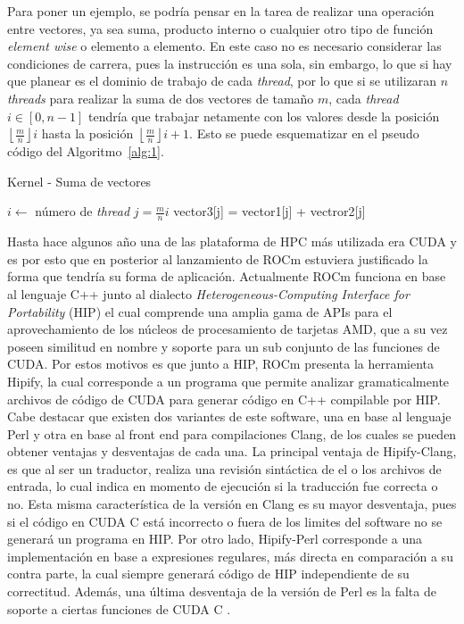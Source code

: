 Para poner un ejemplo, se podría pensar en la tarea de realizar una operación entre vectores, ya sea suma, producto interno o cualquier otro tipo de función \textit{element wise} o elemento a elemento.
En este caso no es necesario considerar las condiciones de carrera, pues la instrucción es una sola, sin embargo, lo que si hay que planear es el dominio de trabajo de cada \textit{thread}, por lo que si se utilizaran \(n\) \textit{threads} para realizar la suma de dos vectores de tamaño \(m\), cada \textit{thread} $i \in [ 0, n-1]$ tendría que trabajar netamente con los valores desde la posición $\left \lfloor{\frac{m}{n}}\right \rfloor  i$ hasta la posición $\left \lfloor{\frac{m}{n}}\right \rfloor i+1$.
Esto se puede esquematizar en el pseudo código del Algoritmo~\ref{alg:1}.
\begin{algorithm}
\caption{Kernel - Suma de vectores}
\label{alg:1}
\begin{algorithmic}[1]
\State $i \leftarrow$ número de \textit{thread}
\State $j = \frac{m}{n} i$  
    \State vector3[j] = vector1[j] + vectror2[j]
\EndFor
\EndProcedure
\end{algorithmic}
\end{algorithm}

Hasta hace algunos año una de las plataforma de HPC más utilizada era CUDA y es por esto que en posterior al lanzamiento de ROCm estuviera justificado la forma que tendría su forma de aplicación. 
Actualmente ROCm funciona en base al lenguaje C++ junto al dialecto \textit{Heterogeneous-Computing Interface for Portability} (HIP) el cual comprende una amplia gama de APIs para el aprovechamiento de los núcleos de procesamiento de tarjetas AMD, que a su vez poseen similitud en nombre y soporte para un sub conjunto de las funciones de CUDA.
Por estos motivos es que junto a HIP, ROCm presenta la herramienta Hipify, la cual corresponde a un programa que permite analizar gramaticalmente archivos de código de CUDA para generar código en C++ compilable por HIP.
Cabe destacar que existen dos variantes de este software, una en base al lenguaje Perl y otra en base al front end para compilaciones Clang, de los cuales se pueden obtener ventajas y desventajas de cada una. 
La principal ventaja de Hipify-Clang, es que al ser un traductor, realiza una revisión sintáctica de el o los archivos de entrada, lo cual indica en momento de ejecución si la traducción fue correcta o no. 
Esta misma característica de la versión en Clang es su mayor desventaja, pues si el código en CUDA C está incorrecto o fuera de los limites del software no se generará un programa en HIP.
Por otro lado, Hipify-Perl corresponde a una implementación en base a expresiones regulares, más directa en comparación a su contra parte, la cual siempre generará código de HIP independiente de su correctitud.
Además, una última desventaja de la versión de Perl es la falta de soporte a ciertas funciones de CUDA C \cite{HIP}.


